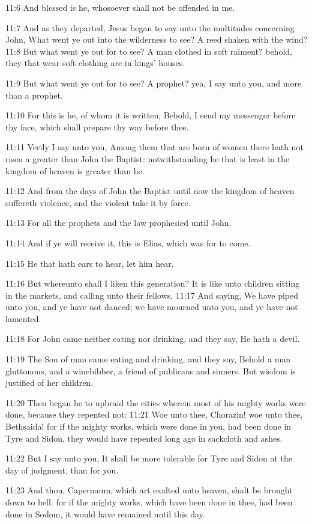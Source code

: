 11:6 And blessed is he, whosoever shall not be offended in me.

11:7 And as they departed, Jesus began to say unto the multitudes
concerning John, What went ye out into the wilderness to see? A reed
shaken with the wind?  11:8 But what went ye out for to see? A man
clothed in soft raiment?  behold, they that wear soft clothing are in
kings' houses.

11:9 But what went ye out for to see? A prophet? yea, I say unto you,
and more than a prophet.

11:10 For this is he, of whom it is written, Behold, I send my
messenger before thy face, which shall prepare thy way before thee.

11:11 Verily I say unto you, Among them that are born of women there
hath not risen a greater than John the Baptist: notwithstanding he
that is least in the kingdom of heaven is greater than he.

11:12 And from the days of John the Baptist until now the kingdom of
heaven suffereth violence, and the violent take it by force.

11:13 For all the prophets and the law prophesied until John.

11:14 And if ye will receive it, this is Elias, which was for to come.

11:15 He that hath ears to hear, let him hear.

11:16 But whereunto shall I liken this generation? It is like unto
children sitting in the markets, and calling unto their fellows, 11:17
And saying, We have piped unto you, and ye have not danced; we have
mourned unto you, and ye have not lamented.

11:18 For John came neither eating nor drinking, and they say, He hath
a devil.

11:19 The Son of man came eating and drinking, and they say, Behold a
man gluttonous, and a winebibber, a friend of publicans and sinners.
But wisdom is justified of her children.

11:20 Then began he to upbraid the cities wherein most of his mighty
works were done, because they repented not: 11:21 Woe unto thee,
Chorazin! woe unto thee, Bethsaida! for if the mighty works, which
were done in you, had been done in Tyre and Sidon, they would have
repented long ago in sackcloth and ashes.

11:22 But I say unto you, It shall be more tolerable for Tyre and
Sidon at the day of judgment, than for you.

11:23 And thou, Capernaum, which art exalted unto heaven, shalt be
brought down to hell: for if the mighty works, which have been done in
thee, had been done in Sodom, it would have remained until this day.

